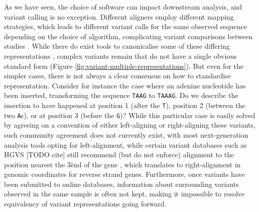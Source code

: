 As we have seen, the choice of software can impact downstream analysis, and variant calling is no exception. Different aligners employ different mapping strategies, which leads to different variant calls for the same observed sequence depending on the choice of algorithm, complicating variant comparisons between studies \cite{zook2014integrating}. While there do exist tools to canonicalise some of these differing representations \cite{vcflib}, complex variants remain that do not have a single obvious standard form (Figure \ref{fig:variant-multiple-representations}).
But even for the simpler cases, there is not always a clear consensus on how to standardise representation. Consider for instance the case where an adenine nucleotide has been inserted, transforming the sequence \verb+TAAG+ to \verb+TAAAG+. Do we describe the insertion to have happened at position 1 (after the \verb+T+), position 2 (between the two \verb+A+s), or at position 3 (before the \verb+G+)? While this particular case is easily solved by agreeing on a convention of either left-aligning or right-aligning these variants, such community agreement does not currently exist, with most next-generation analysis tools opting for left-alignment, while certain variant databases such as HGVS [TODO cite] still recommend (but do not enforce) alignment to the position nearest the 3\` end of the gene \cite{hgvs-position}, which translates to right-alignment in genomic coordinates for reverse strand genes. Furthermore, once variants have been submitted to online databases, information about surrounding variants observed in the same sample is often not kept, making it impossible to resolve equivalency of variant representations going forward.


